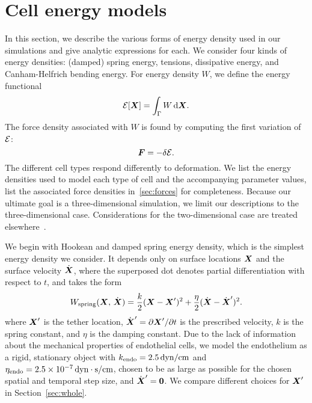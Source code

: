 \section{Cell energy models}\label{sec:energy}

In this section, we describe the various forms of energy density used in our simulations
and give analytic expressions for each. We consider four kinds of energy densities:
(damped) spring energy, tensions, dissipative energy, and Canham-Helfrich bending energy.
For energy density
$W$, we define the energy functional
\begin{equation*}
    \energy[\X] = \int_\interface W \d\X.
\end{equation*}
The force density associated with $W$ is found by computing the first variation of
$\mathcal{E}$: 
\begin{equation}
    \boldsymbol{F} = -\delta\mathcal{E}.
\end{equation}
The different cell types respond differently to deformation. We list the energy densities
used to model each type of cell and the accompanying parameter values, list the
associated force densities in~\ref{sec:forces} for completeness. Because our ultimate
goal is a three-dimensional simulation, we limit our descriptions to the
three-dimensional case.  Considerations for the two-dimensional case are treated
elsewhere~\cite{Erickson:2010uzba}.

We begin with Hookean and damped spring energy density, which is the simplest energy
density we consider. It depends only on surface locations $\boldsymbol{X}$ and the surface velocity
$\dot{\boldsymbol{X}}$, where the superposed dot denotes partial differentiation with respect to $t$, and
takes the form
\begin{equation}
    W_\text{spring}(\boldsymbol{X},\,\dot{\boldsymbol{X}}) = \frac{k}2 (\boldsymbol{X} - \boldsymbol{X}')^2 + \frac{\eta}2(\dot{\boldsymbol{X}} - \dot{\boldsymbol{X}}')^2.
\end{equation}
where $\boldsymbol{X}'$ is the tether location, $\dot{\boldsymbol{X}}' = \partial\boldsymbol{X}'/\partial t$ is the prescribed
velocity, $k$ is the spring constant, and $\eta$ is the damping constant. Due to the lack
of information about the mechanical properties of endothelial cells, we model the
endothelium as a rigid, stationary object with $k_\text{endo} = 2.5\dynpercm$ and
$\eta_\text{endo} = 2.5\times 10^{-7}\dynsecpercm$, chosen to be as large as possible for
the chosen spatial and temporal step size, and $\dot{\boldsymbol{X}}' = \boldsymbol{0}$. We compare different
choices for $\boldsymbol{X}'$ in Section~\ref{sec:whole}.


